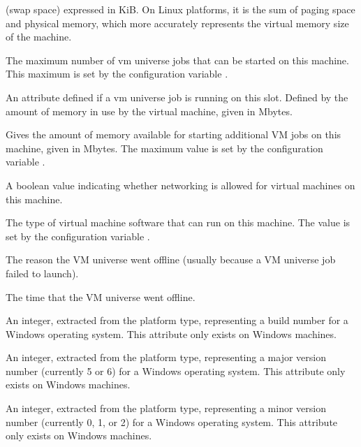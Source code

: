 \begin{description}
(swap space) expressed in KiB.
On Linux platforms, it is the sum of paging space and physical memory, 
which more accurately represents the virtual memory size of the machine. 
%
\item[\AdAttr{VM\_AvailNum}:] The maximum number of vm universe jobs that
can be started on this machine. This maximum is set by the configuration
variable . 
%
\item[\AdAttr{VM\_Guest\_Mem}:] An attribute defined if a vm universe job
is running on this slot.  Defined by the amount of memory in use by the 
virtual machine, given in Mbytes.
%
\item[\AdAttr{VM\_Memory}:] Gives the amount of memory available for starting 
additional VM jobs on this machine, given in Mbytes.
The maximum value is set by the configuration variable .
%
\item[\AdAttr{VM\_Networking}:] A boolean value indicating whether networking 
is allowed for virtual machines on this machine.
%
\item[\AdAttr{VM\_Type}:] The type of virtual machine software that can run
on this machine.  The value is set by the configuration variable
.
%
\item[\AdAttr{VMOfflineReason}:]  The reason the VM universe went offline
(usually because a VM universe job failed to launch).
%
\item[\AdAttr{VMOfflineTime}:]  The time that the VM universe went offline.
%
\item[\AdAttr{WindowsBuildNumber}:] An integer, extracted from the
platform type, representing a build number 
for a Windows operating system.
This attribute only exists on Windows machines.
%
\item[\AdAttr{WindowsMajorVersion}:] An integer, extracted from the
platform type, representing a major version number (currently 5 or 6)
for a Windows operating system.
This attribute only exists on Windows machines.
%
\item[\AdAttr{WindowsMinorVersion}:] An integer, extracted from the
platform type, representing a minor version number (currently 0, 1, or 2)
for a Windows operating system.
This attribute only exists on Windows machines.

\end{description}

